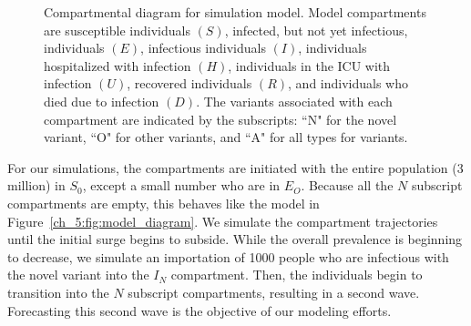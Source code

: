 \begin{figure}
    \centering
    \caption[Compartmental diagram for simulation model.]{Compartmental diagram for simulation model.
    Model compartments are susceptible individuals \( (S) \), infected, but not yet infectious, individuals \( (E) \), infectious individuals \( (I) \), individuals hospitalized with infection \( (H) \), individuals in the ICU with infection \( (U) \),  recovered individuals \( (R) \), and individuals who died due to infection \( (D) \).
    The variants associated with each compartment are indicated by the subscripts: ``N" for the novel variant, ``O" for other variants, and ``A" for all types for variants.}
    \label{ch_5:fig:full_model_diagram_compact}
\end{figure}

For our simulations, the compartments are initiated with the entire population (3 million) in \( S_0 \), except a small number who are in \( E_O \).
Because all the \( N \) subscript compartments are empty, this behaves like the model in Figure~\ref{ch_5:fig:model_diagram}.
We simulate the compartment trajectories until the initial surge begins to subside.
While the overall prevalence is beginning to decrease, we simulate an importation of 1000 people who are infectious with the novel variant into the \( I_N \) compartment.
Then, the individuals begin to transition into the \( N \) subscript compartments, resulting in a second wave.
Forecasting this second wave is the objective of our modeling efforts.

